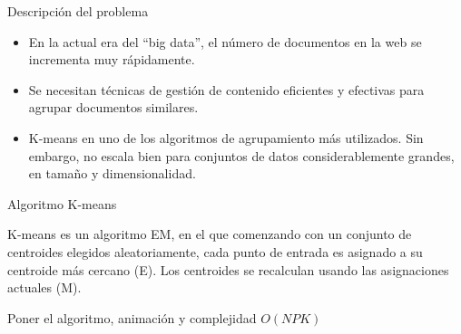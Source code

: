 \begin{frame}{Descripción del problema}
    
    \begin{itemize}
        \item 
        En la actual era del ``big data'', el 
        número de documentos en la web se 
        incrementa muy rápidamente.
        \item 
        Se necesitan técnicas de gestión 
        de contenido eficientes y efectivas
        para agrupar documentos similares.
        \item
        K-means en uno de los algoritmos de agrupamiento
        más utilizados. Sin embargo, no escala bien
        para conjuntos de datos considerablemente 
        grandes, en tamaño y dimensionalidad.
    \end{itemize}
    
    
\end{frame}

\begin{frame}{Algoritmo K-means}

K-means es un algoritmo EM, en el que comenzando
con un conjunto de centroides elegidos aleatoriamente,
cada punto de entrada es asignado a su centroide 
más cercano (E). Los centroides se recalculan 
usando las asignaciones actuales (M).
\end{frame}


\begin{frame}
Poner el algoritmo, animación y complejidad $O(NPK)$
\end{frame}